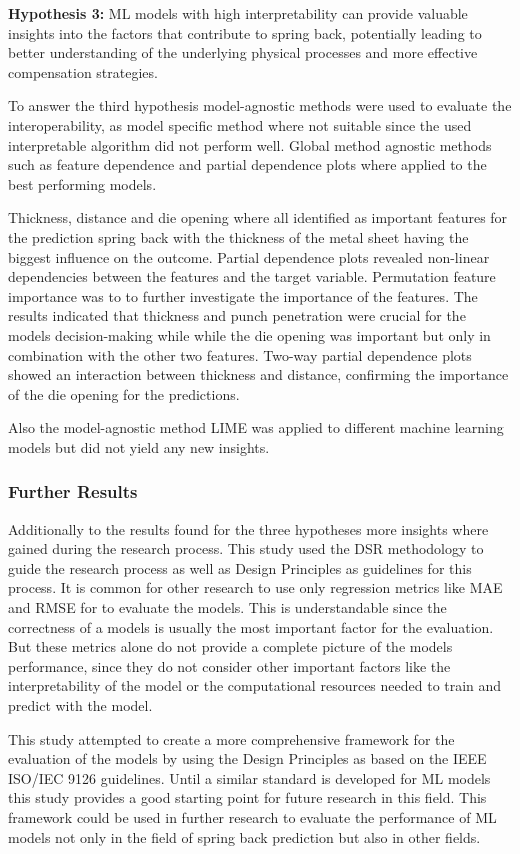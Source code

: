 \textbf{Hypothesis 3:} ML models with high interpretability can provide valuable insights into the factors that
contribute to spring back, potentially leading to better understanding of the underlying physical processes and
more effective compensation strategies.

To answer the third hypothesis model-agnostic methods were used to evaluate the interoperability, as model specific
method where not suitable since the used interpretable algorithm did not perform well.
Global method agnostic methods such as feature dependence and partial dependence plots where applied to the best
performing models.

Thickness, distance and die opening where all identified as important features for the prediction spring back with the
thickness of the metal sheet having the biggest influence on the outcome.
Partial dependence plots revealed non-linear dependencies between the features and the target variable.
Permutation feature importance was  to to further investigate the importance of the features.
The results indicated that thickness and punch penetration were crucial for the models decision-making while while the
die opening was important but only in combination with the other two features.
Two-way partial dependence plots showed an interaction between thickness and distance, confirming the importance of the
die opening for the predictions.

Also the model-agnostic method LIME was applied to different machine learning models but did not yield any new insights.

\subsubsection*{Further Results}
Additionally to the results found for the three hypotheses more insights where gained during the research process.
This study used the \ac{DSR} methodology to guide the research process as well as Design Principles as guidelines for
this process.
It is common for other research to use only regression metrics like MAE and RMSE for to evaluate the models.
This is understandable since the correctness of a models is usually the most important factor for the evaluation.
But these metrics alone do not provide a complete picture of the models performance, since they do not consider
other important factors like the interpretability of the model or the computational resources needed to train and
predict with the model.

This study attempted to create a more comprehensive framework for the evaluation of the models by using the Design
Principles as based on the IEEE ISO/IEC 9126 guidelines.
Until a similar standard is developed for \ac{ML} models this study provides a good starting point for future research
in this field.
This framework could be used in further research to evaluate the performance of \ac{ML} models not only in the field of
spring back prediction but also in other fields.


